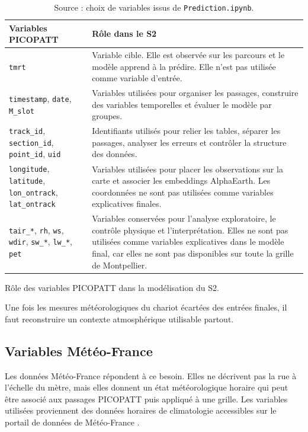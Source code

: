 \documentclass{article}
\begin{document}
\begin{table}[H]
\centering
\renewcommand{\arraystretch}{1.18}
\small
\begin{tabularx}{\textwidth}{p{}Y}
\toprule
\textbf{Variables PICOPATT} & \textbf{Rôle dans le S2} \\
\midrule
\texttt{tmrt} &
Variable cible. Elle est observée sur les parcours et le modèle apprend à la prédire. Elle n'est pas utilisée comme variable d'entrée. \\
\addlinespace
\texttt{timestamp}, \texttt{date}, \texttt{M\_slot} &
Variables utilisées pour organiser les passages, construire des variables temporelles et évaluer le modèle par groupes. \\
\addlinespace
\texttt{track\_id}, \texttt{section\_id}, \texttt{point\_id}, \texttt{uid} &
Identifiants utilisés pour relier les tables, séparer les passages, analyser les erreurs et contrôler la structure des données. \\
\addlinespace
\texttt{longitude}, \texttt{latitude}, \texttt{lon\_ontrack}, \texttt{lat\_ontrack} &
Variables utilisées pour placer les observations sur la carte et associer les embeddings AlphaEarth. Les coordonnées ne sont pas utilisées comme variables explicatives finales. \\
\addlinespace
\texttt{tair\_*}, \texttt{rh}, \texttt{ws}, \texttt{wdir}, \texttt{sw\_*}, \texttt{lw\_*}, \texttt{pet} &
Variables conservées pour l'analyse exploratoire, le contrôle physique et l'interprétation. Elles ne sont pas utilisées comme variables explicatives dans le modèle final, car elles ne sont pas disponibles sur toute la grille de Montpellier. \\
\bottomrule
\end{tabularx}
\caption{Rôle des variables PICOPATT dans la modélisation du S2.}
\vspace{-0.45cm}
\caption*{\footnotesize Source : choix de variables issus de \texttt{Prediction.ipynb}.}
\label{tab:variables-picopatt-modele}
\end{table}

Une fois les mesures météorologiques du chariot écartées des entrées finales, il faut reconstruire un contexte atmosphérique utilisable partout.
\subsection{Variables Météo-France}

Les données Météo-France répondent à ce besoin. Elles ne décrivent pas la rue à l'échelle du mètre, mais elles donnent un état météorologique horaire qui peut être associé aux passages PICOPATT puis appliqué à une grille.
Les variables utilisées proviennent des données horaires de climatologie accessibles sur le portail de données de Météo-France \cite{meteofrance-donnees-horaires}. 
\end{document}
